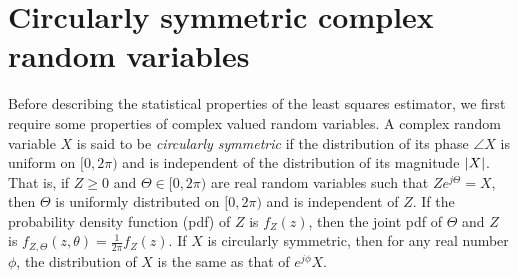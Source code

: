 \documentclass{article}
\begin{document}



\section{Circularly symmetric complex random variables}\label{sec:circ-symm-compl}

Before describing the statistical properties of the least squares estimator, we first require some properties of complex valued random variables.  
A complex random variable $X$ is said to be \emph{circularly symmetric} if the distribution of its phase $\angle{X}$ is uniform on $[0,2\pi)$ and is independent of the distribution of its magnitude ${\left\vert X \right\vert}$.  That is, if $Z \geq 0$ and $\Theta \in [0,2\pi)$ are real random variables such that $Ze^{j\Theta} = X$, then $\Theta$ is uniformly distributed on $[0,2\pi)$ and is independent of $Z$.  If the probability density function (pdf) of $Z$ is $f_Z(z)$, then the joint pdf of $\Theta$ and $Z$ is $f_{Z,\Theta}(z,\theta) = \frac{1}{2\pi}f_Z(z)$.
If $X$ is circularly symmetric, then for any real number $\phi$, the distribution of $X$ is the same as that of $e^{j\phi}X$.  %
\end{document}
